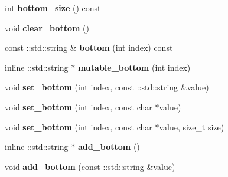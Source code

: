 \begin{DoxyCompactItemize}
\item 
\mbox{\label{classcaffe_1_1_v1_layer_parameter_a7bc0bb47b26ab3d404f8f7bbc786dd8d}} 
int {\bfseries bottom\+\_\+size} () const
\item 
\mbox{\label{classcaffe_1_1_v1_layer_parameter_a1582fd0b2e2db83a7091164fe8894b7a}} 
void {\bfseries clear\+\_\+bottom} ()
\item 
\mbox{\label{classcaffe_1_1_v1_layer_parameter_a6eadff5ba6c563b3e50bd43f87e06a3a}} 
const \+::std\+::string \& {\bfseries bottom} (int index) const
\item 
\mbox{\label{classcaffe_1_1_v1_layer_parameter_a3bc553a0994a76d118076e45c3694eef}} 
inline \+::std\+::string $\ast$ {\bfseries mutable\+\_\+bottom} (int index)
\item 
\mbox{\label{classcaffe_1_1_v1_layer_parameter_a8ec0bfc5e7298b0cc71f845d8df22e6c}} 
void {\bfseries set\+\_\+bottom} (int index, const \+::std\+::string \&value)
\item 
\mbox{\label{classcaffe_1_1_v1_layer_parameter_a9d91b1c781df8bef436c894e32ef1755}} 
void {\bfseries set\+\_\+bottom} (int index, const char $\ast$value)
\item 
\mbox{\label{classcaffe_1_1_v1_layer_parameter_a376fed34847d15d8dc1df2b9e3c5bc73}} 
void {\bfseries set\+\_\+bottom} (int index, const char $\ast$value, size\+\_\+t size)
\item 
\mbox{\label{classcaffe_1_1_v1_layer_parameter_a3f5dee620ee9c235a66ac73dffbe2ea3}} 
inline \+::std\+::string $\ast$ {\bfseries add\+\_\+bottom} ()
\item 
\mbox{\label{classcaffe_1_1_v1_layer_parameter_a907ed0abc4549b811a01aba081eddb07}} 
void {\bfseries add\+\_\+bottom} (const \+::std\+::string \&value)
\item 
\mbox{\label{classcaffe_1_1_v1_layer_parameter_a84a5f7929f82e363bd18ad1f7e7a8f40}} 

\end{DoxyCompactItemize}
